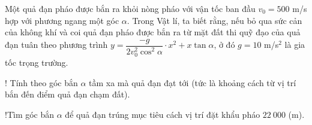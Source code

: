 \begin{bt}%
 
	Một quả đạn pháo được bắn ra khỏi nòng pháo với vận tốc ban đầu $ v_0=500$ m/s hợp với phương ngang một góc $ \alpha $. Trong Vật lí, ta biết rằng, nếu bỏ qua sức cản của không khí và coi quả đạn pháo được bắn ra từ mặt đất thi quỹ đạo của quả đạn tuân theo phương trình $ y=\dfrac{-g}{2v_0^2\cos^2\alpha}\cdot x^2+x\tan \alpha $, ở đó $g = 10$ m/s$ ^2 $ là gia tốc trọng trường.
	\begin{listEX}[2]
		\item! Tính theo góc bắn $\alpha$ tầm xa mà quả đạn đạt tới (tức là khoảng cách từ vị trí bắn đến điểm quả đạn chạm đất).
		\item!Tìm góc bắn $ \alpha $ để quả đạn trúng mục tiêu cách vị trí đặt khẩu pháo $22~000$ (m).
	\end{listEX}
\end{bt}

